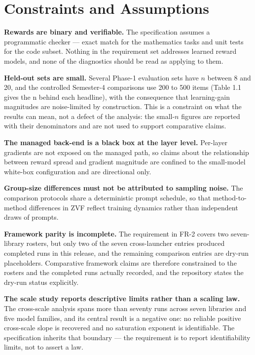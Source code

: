 \documentclass[12pt,a4paper]{report}
\begin{document}
\section{Constraints and Assumptions}\label{constraints-and-assumptions}

\textbf{Rewards are binary and verifiable.} The specification assumes a
programmatic checker --- exact match for the mathematics tasks and unit
tests for the code subset. Nothing in the requirement set addresses
learned reward models, and none of the diagnostics should be read as
applying to them.

\textbf{Held-out sets are small.} Several Phase-1 evaluation sets have
\(n\) between 8 and 20, and the controlled Semester-4 comparisons use
200 to 500 items (Table 1.1 gives the n behind each headline), with the
consequence that learning-gain magnitudes are noise-limited by
construction. This is a constraint on what the results can mean, not a
defect of the analysis: the small-\(n\) figures are reported with their
denominators and are not used to support comparative claims.

\textbf{The managed back-end is a black box at the layer level.}
Per-layer gradients are not exposed on the managed path, so claims about
the relationship between reward spread and gradient magnitude are
confined to the small-model white-box configuration and are directional
only.

\textbf{Group-size differences must not be attributed to sampling
noise.} The comparison protocols share a deterministic prompt schedule,
so that method-to-method differences in ZVF reflect training dynamics
rather than independent draws of prompts.

\textbf{Framework parity is incomplete.} The requirement in FR-2 covers
two seven-library rosters, but only two of the seven cross-launcher
entries produced completed runs in this release, and the remaining
comparison entries are dry-run placeholders. Comparative framework
claims are therefore constrained to the rosters and the completed runs
actually recorded, and the repository states the dry-run status
explicitly.

\textbf{The scale study reports descriptive limits rather than a scaling
law.} The cross-scale analysis spans more than seventy runs across seven
libraries and five model families, and its central result is a negative
one: no reliable positive cross-scale slope is recovered and no
saturation exponent is identifiable. The specification inherits that
boundary --- the requirement is to report identifiability limits, not to
assert a law.
\end{document}

